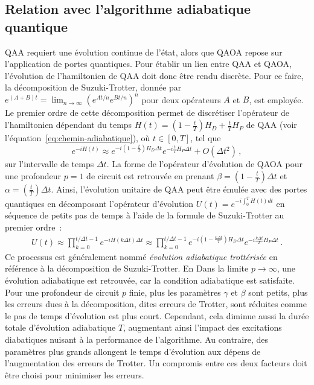 
\subsection{Relation avec l'algorithme adiabatique quantique}
\label{subsec:discretisation-qaoa}

QAA requiert une évolution continue de l'état, alors que QAOA repose sur l'application de portes quantiques. Pour établir un lien entre QAA et QAOA, l'évolution de l'hamiltonien de QAA doit donc être rendu discrète. Pour ce faire, la décomposition de Suzuki-Trotter, donnée par $e^{(A+B)t} = \lim_{n \to \infty} (e^{At / n} e^{Bt / n})^{n}$ pour deux opérateurs $A$ et $B$, est employée. Le premier ordre de cette décomposition permet de discrétiser l'opérateur de l'hamiltonien dépendant du temps $H(t)=(1-\frac{t}{T})H_{D} + \frac{t}{T}H_{P}$ de QAA (voir l'équation~\ref{eq:chemin-adiabatique}), où $t \in [0, T]$, tel que
\begin{equation}
    e^{-i H(t) } \approx e^{-i (1 - \frac{t}{T}) H_D \Delta t} e^{-i \frac{t}{T} H_P \Delta t} + O(\Delta t^2) \,,
\end{equation}
sur l'intervalle de temps $\Delta t$. La forme de l'opérateur d'évolution de QAOA pour une profondeur $p=1$ de circuit est retrouvée en prenant $\beta = (1 - \frac{t}{T}) \Delta t$ et $\alpha = (\frac{t}{T}) \Delta t$. Ainsi, l'évolution unitaire de QAA peut être émulée avec des portes quantiques en décomposant l'opérateur d'évolution $U(t) = e^{-i \int_{0}^{T} H(t) dt}$ en séquence de petits pas de temps à l'aide de la formule de Suzuki-Trotter au premier ordre~\cite{blekosReviewQuantumApproximate2024}:
\begin{align*}
   U(t) \approx \prod_{k=0}^{t / \Delta t -1} e^{-i H(k \Delta t) \Delta t} \approx \prod_{k=0}^{t / \Delta t -1} e^{-i (1 - \frac{k \Delta t}{T}) H_{D} \Delta t} e^{- i \frac{k \Delta t}{T} H_{P} \Delta t} \,.
\end{align*}
Ce processus est généralement nommé \textit{évolution adiabatique trottérisée} en référence à la décomposition de Suzuki-Trotter. En  Dans la limite $p \to \infty$, une évolution adiabatique est retrouvée, car la condition adiabatique est satisfaite. Pour une profondeur de circuit $p$ finie, plus les paramètres $\gamma$ et $\beta$ sont petits, plus les erreurs dues à la décomposition, dites erreurs de Trotter, sont réduites comme le pas de temps d'évolution est plus court. Cependant, cela diminue aussi la durée totale d'évolution adiabatique $T$, augmentant ainsi l'impact des excitations diabatiques nuisant à la performance de l'algorithme. Au contraire, des paramètres plus grands allongent le temps d'évolution aux dépens de l'augmentation des erreurs de Trotter. Un compromis entre ces deux facteurs doit être choisi pour minimiser les erreurs.

